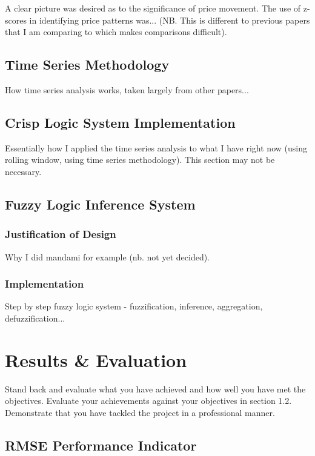 \documentclass{article}
\begin{document}
A clear picture was desired as to the significance of price movement. The use of z-scores in identifying price patterns was... (NB. This is different to previous papers that I am comparing to which makes comparisons difficult).

\subsection{Time Series Methodology}

How time series analysis works, taken largely from other papers...

\subsection{Crisp Logic System Implementation}

Essentially how I applied the time series analysis to what I have right now (using rolling window, using time series methodology). This section may not be necessary.

\subsection{Fuzzy Logic Inference System}

\subsubsection{Justification of Design}

Why I did mandami for example (nb. not yet decided).

\subsubsection{Implementation}

Step by step fuzzy logic system - fuzzification, inference, aggregation, defuzzification...

\section{Results \& Evaluation}
Stand back and evaluate what you have achieved and how well you have met the objectives. Evaluate your achievements against your objectives in section 1.2. Demonstrate that you have tackled the project in a professional manner. 

\subsection{RMSE Performance Indicator}
\end{document}
